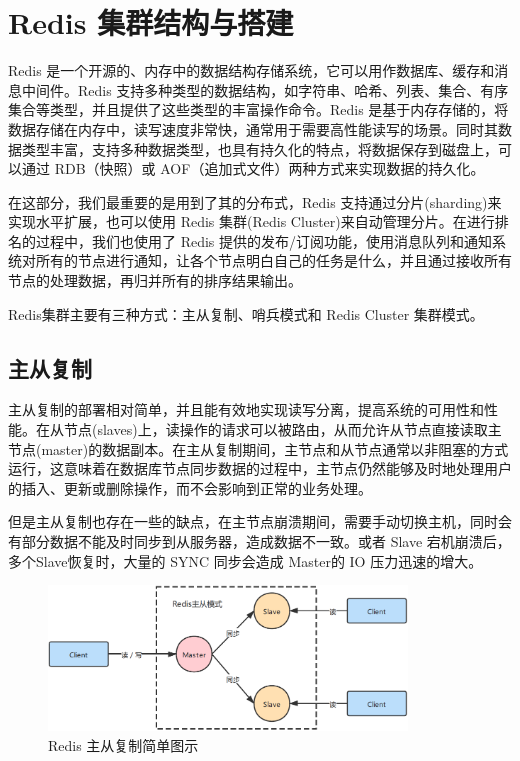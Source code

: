 \documentclass[12pt,hyperref,a4paper,UTF8]{ctexart}
\begin{document}
\newpage
\section{Redis 集群结构与搭建}

Redis 是一个开源的、内存中的数据结构存储系统，它可以用作数据库、缓存和消息中间件。Redis 支持多种类型的数据结构，如字符串、哈希、列表、集合、有序集合等类型，并且提供了这些类型的丰富操作命令。Redis 是基于内存存储的，将数据存储在内存中，读写速度非常快，通常用于需要高性能读写的场景。同时其数据类型丰富，支持多种数据类型，也具有持久化的特点，将数据保存到磁盘上，可以通过 RDB（快照）或 AOF（追加式文件）两种方式来实现数据的持久化。

在这部分，我们最重要的是用到了其的分布式，Redis 支持通过分片(sharding)来实现水平扩展，也可以使用 Redis 集群(Redis Cluster)来自动管理分片。在进行排名的过程中，我们也使用了 Redis 提供的发布/订阅功能，使用消息队列和通知系统对所有的节点进行通知，让各个节点明白自己的任务是什么，并且通过接收所有节点的处理数据，再归并所有的排序结果输出。

Redis集群主要有三种方式：主从复制、哨兵模式和 Redis Cluster 集群模式。

\subsection{主从复制}

主从复制的部署相对简单，并且能有效地实现读写分离，提高系统的可用性和性能。在从节点(slaves)上，读操作的请求可以被路由，从而允许从节点直接读取主节点(master)的数据副本。在主从复制期间，主节点和从节点通常以非阻塞的方式运行，这意味着在数据库节点同步数据的过程中，主节点仍然能够及时地处理用户的插入、更新或删除操作，而不会影响到正常的业务处理。

但是主从复制也存在一些的缺点，在主节点崩溃期间，需要手动切换主机，同时会有部分数据不能及时同步到从服务器，造成数据不一致。或者 Slave 宕机崩溃后，多个Slave恢复时，大量的 SYNC 同步会造成 Master的 IO 压力迅速的增大。

\begin{figure}[H]
\centering
\includegraphics[width=0.85\textwidth]{figures/redis_master_slave.png}
\caption{Redis 主从复制简单图示} 
\end{figure}
\end{document}
